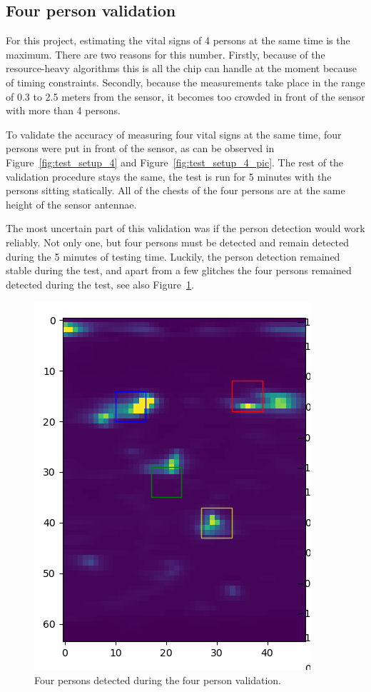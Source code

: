 \subsection{Four person validation}
\label{sec:four-person-validation}
For this project, estimating the vital signs of 4 persons at the same time is the maximum. There are two reasons for this number. Firstly, because of the resource-heavy algorithms this is all the chip can handle at the moment because of timing constraints. Secondly, because the measurements take place in the range of 0.3 to 2.5 meters from the sensor, it becomes too crowded in front of the sensor with more than 4 persons. 

To validate the accuracy of measuring four vital signs at the same time, four persons were put in front of the sensor, as can be observed in Figure~\ref{fig:test_setup_4} and Figure~\ref{fig:test_setup_4_pic}. The rest of the validation procedure stays the same, the test is run for 5 minutes with the persons sitting statically. All of the chests of the four persons are at the same height of the sensor antennae. 

The most uncertain part of this validation was if the person detection would work reliably. Not only one, but four persons must be detected and remain detected during the 5 minutes of testing time. Luckily, the person detection remained stable during the test, and apart from a few glitches the four persons remained detected during the test, see also Figure~\ref{fig:4_persons_detected}.

\begin{figure}[t]
    \centering
    \includegraphics[width=.4\textwidth]{figures/validation/4personen_testen_crop.png}
    \caption{Four persons detected during the four person validation.}
    \label{fig:4_persons_detected}
\end{figure}

